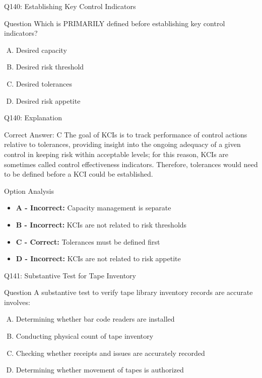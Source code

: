 \documentclass{beamer}
\begin{document}
	\begin{frame}{Q140: Establishing Key Control Indicators}
		\begin{block}{Question}
			Which is PRIMARILY defined before establishing key control indicators?
		\end{block}
		\begin{enumerate}[(A)]
			\item Desired capacity
			\item Desired risk threshold
			\item Desired tolerances
			\item Desired risk appetite
		\end{enumerate}
	\end{frame}
	
	\begin{frame}{Q140: Explanation}
		\begin{block}{Correct Answer: C}
			The goal of KCIs is to track performance of control actions relative to tolerances, providing insight into the ongoing adequacy of a given control in keeping risk within acceptable levels; for this reason, KCIs are sometimes called control effectiveness indicators. Therefore, tolerances would need to be defined before a KCI could be established.
		\end{block}
		\begin{block}{Option Analysis}
			\begin{itemize}
				\item \textbf{A - Incorrect:} Capacity management is separate
				\item \textbf{B - Incorrect:} KCIs are not related to risk thresholds
				\item \textbf{C - Correct:} Tolerances must be defined first
				\item \textbf{D - Incorrect:} KCIs are not related to risk appetite
			\end{itemize}
		\end{block}
	\end{frame}
	
	\begin{frame}{Q141: Substantive Test for Tape Inventory}
		\begin{block}{Question}
			A substantive test to verify tape library inventory records are accurate involves:
		\end{block}
		\begin{enumerate}[(A)]
			\item Determining whether bar code readers are installed
			\item Conducting physical count of tape inventory
			\item Checking whether receipts and issues are accurately recorded
			\item Determining whether movement of tapes is authorized
		\end{enumerate}
	\end{frame}
	
\end{document}
